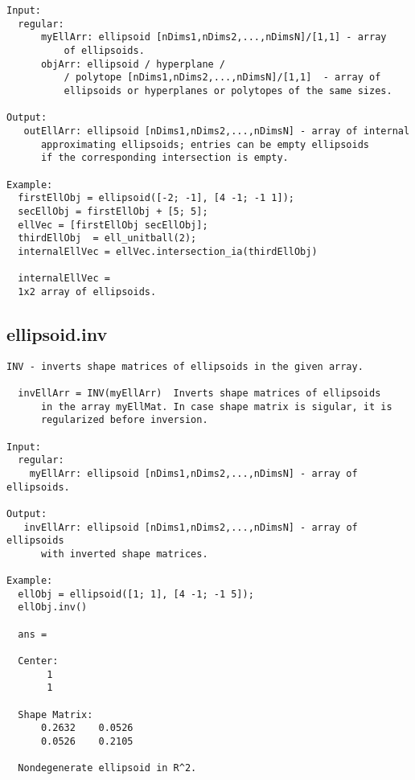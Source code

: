 \begin{verbatim}
Input:
  regular:
      myEllArr: ellipsoid [nDims1,nDims2,...,nDimsN]/[1,1] - array
          of ellipsoids.
      objArr: ellipsoid / hyperplane /
          / polytope [nDims1,nDims2,...,nDimsN]/[1,1]  - array of
          ellipsoids or hyperplanes or polytopes of the same sizes.

Output:
   outEllArr: ellipsoid [nDims1,nDims2,...,nDimsN] - array of internal
      approximating ellipsoids; entries can be empty ellipsoids
      if the corresponding intersection is empty.

Example:
  firstEllObj = ellipsoid([-2; -1], [4 -1; -1 1]);
  secEllObj = firstEllObj + [5; 5];
  ellVec = [firstEllObj secEllObj];
  thirdEllObj  = ell_unitball(2);
  internalEllVec = ellVec.intersection_ia(thirdEllObj)

  internalEllVec =
  1x2 array of ellipsoids.
\end{verbatim}
\subsection{\texorpdfstring{ellipsoid.inv}{inv}}\label{method:ellipsoid.inv}
\begin{verbatim}
INV - inverts shape matrices of ellipsoids in the given array.

  invEllArr = INV(myEllArr)  Inverts shape matrices of ellipsoids
      in the array myEllMat. In case shape matrix is sigular, it is
      regularized before inversion.

Input:
  regular:
    myEllArr: ellipsoid [nDims1,nDims2,...,nDimsN] - array of ellipsoids.

Output:
   invEllArr: ellipsoid [nDims1,nDims2,...,nDimsN] - array of ellipsoids
      with inverted shape matrices.

Example:
  ellObj = ellipsoid([1; 1], [4 -1; -1 5]);
  ellObj.inv()

  ans =

  Center:
       1
       1

  Shape Matrix:
      0.2632    0.0526
      0.0526    0.2105

  Nondegenerate ellipsoid in R^2.
\end{verbatim}
